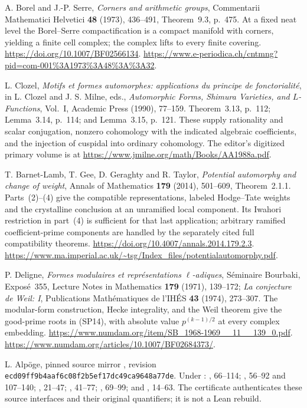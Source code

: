A. Borel and J.-P. Serre, \emph{Corners and arithmetic groups},
Commentarii Mathematici Helvetici \textbf{48} (1973),
436--491, Theorem~9.3, p.~475.  At a fixed neat level the
Borel--Serre compactification is a compact manifold with
corners, yielding a finite cell complex; the complex lifts
to every finite covering.
\url{https://doi.org/10.1007/BF02566134}.
\url{https://www.e-periodica.ch/cntmng?pid=com-001%3A1973%3A48%3A%3A32}.

L. Clozel, \emph{Motifs et formes automorphes: applications
du principe de fonctorialit\'e}, in L. Clozel and J. S. Milne,
eds., \emph{Automorphic Forms, Shimura Varieties, and
$L$-Functions}, Vol.~I, Academic Press (1990), 77--159.
Theorem~3.13, p.~112; Lemma~3.14, p.~114; and
Lemma~3.15, p.~121.  These supply rationality and scalar
conjugation, nonzero cohomology with the indicated algebraic
coefficients, and the injection of cuspidal into ordinary
cohomology.  The editor's digitized primary volume is at
\url{https://www.jmilne.org/math/Books/AA1988a.pdf}.

T. Barnet-Lamb, T. Gee, D. Geraghty and R. Taylor,
\emph{Potential automorphy and change of weight},
Annals of Mathematics \textbf{179} (2014), 501--609,
Theorem~2.1.1.  Parts~(2)--(4) give the compatible
representations, labeled Hodge--Tate weights and the
crystalline conclusion at an unramified local component.
Its Iwahori restriction in part~(4) is sufficient for that
last application; arbitrary ramified coefficient-prime
components are handled by the separately cited full
compatibility theorems.
\url{https://doi.org/10.4007/annals.2014.179.2.3}.
\url{https://www.ma.imperial.ac.uk/~tsg/Index_files/potentialautomorphy.pdf}.

P. Deligne, \emph{Formes modulaires et repr\'esentations
$\ell$-adiques}, S\'eminaire Bourbaki, Expos\'e~355,
Lecture Notes in Mathematics \textbf{179} (1971), 139--172;
\emph{La conjecture de Weil: I}, Publications
Math\'ematiques de l'IH\'ES \textbf{43} (1974), 273--307.
The modular-form construction, Hecke integrality, and
the Weil theorem give the good-prime roots in (SP14),
with absolute value $p^{(k-1)/2}$ at every complex embedding.
\url{https://www.numdam.org/item/SB_1968-1969__11__139_0.pdf}.
\url{https://www.numdam.org/articles/10.1007/BF02684373/}.

L. Alp\"oge, pinned source mirror , revision
\newline\texttt{ecd09ff9b4aaf6c08f2b5ef17dc49ca9648a77de}.
Under :
,
66--114; ,
56--92 and 107--140; ,
21--47; ,
41--77; ,
69--99; and
,
14--63.  The certificate authenticates these source interfaces
and their original quantifiers; it is not a Lean rebuild.


